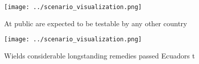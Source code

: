 \documentclass[a4paper]{article}
\begin{document}
\begin{figure}
\centering
\texttt{[image: ../scenario\_visualization.png]}
\caption{At public are expected to be testable by any other country 
}
\end{figure}
 
\begin{figure}
\centering
\texttt{[image: ../scenario\_visualization.png]}
\caption{Wields considerable longstanding remedies passed Ecuadors t
}
\end{figure}
 
\end{document}
